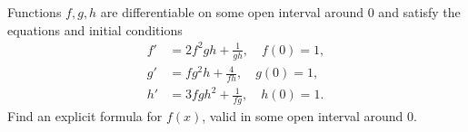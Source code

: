 Functions $f,g,h$ are differentiable on some open interval around $0$ and satisfy the equations and initial conditions
\begin{align*}
	f'&=2f^2gh+\frac{1}{gh},\quad f(0)=1,\\
	g'&=fg^2h+\frac{4}{fh},\quad g(0)=1,\\
	h'&=3fgh^2+\frac{1}{fg},\quad h(0)=1.
\end{align*}
Find an explicit formula for $f(x)$, valid in some open interval around $0$.